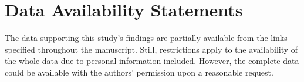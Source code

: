 \section{Data Availability Statements}\label{sec-data-availability-statements}
The data supporting this study's findings are partially available from the links specified throughout the manuscript. Still, restrictions apply to the availability of the whole data due to personal information included. However, the complete data could be available with the authors' permission upon a reasonable request.